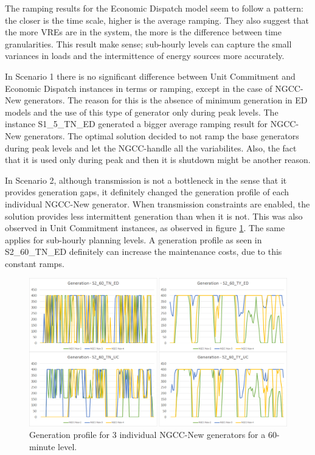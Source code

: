 \documentclass[12pt,LUDisStyle,twosided]{book}
\begin{document}
The ramping results for the Economic Dispatch model seem to follow a pattern: the closer is the time scale, higher is the average ramping. They also suggest that the more VREs are in the system, the more is the difference between time granularities. This result make sense; sub-hourly levels can capture the small variances in loads and the intermittence of energy sources more accurately. 

In Scenario 1 there is no significant difference between Unit Commitment and Economic Dispatch instances in terms or ramping, except in the case of NGCC-New generators. The reason for this is the absence of minimum generation in ED models and the use of this type of generator only during peak levels. The instance S1\_5\_TN\_ED generated a bigger average ramping result for NGCC-New generators. The optimal solution decided to not ramp the base generators during peak levels and let the NGCC-handle all the variabilites. Also, the fact that it is used only during peak and then it is shutdown might be another reason.

In Scenario 2, although transmission is not a bottleneck in the sense that it provides generation gaps, it definitely changed the generation profile of each individual NGCC-New generator. When transmission constraints are enabled, the solution provides less intermittent generation than when it is not. This was also observed in Unit Commitment instances, as observed in figure    \ref{fig:generationProfileNGCC}. The same applies for sub-hourly planning levels. A generation profile as seen in S2\_60\_TN\_ED definitely can increase the maintenance costs, due to this constant ramps.

\begin{figure}[H] 
  \centering
  
	  \includegraphics[width=\textwidth,keepaspectratio]{generationProfileNGCC.png}
  
  \caption{Generation profile for 3 individual NGCC-New generators for a 60-minute level.}
  \label{fig:generationProfileNGCC}
  
\end{figure}
\end{document}
